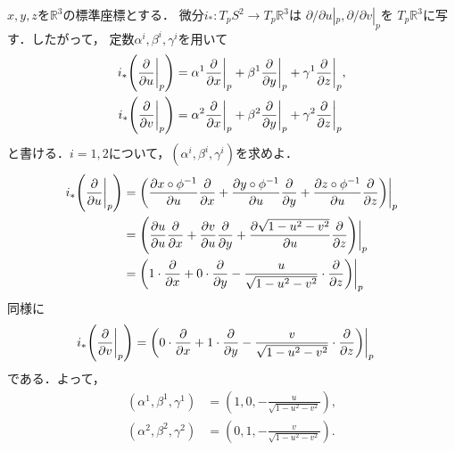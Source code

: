 \documentclass[dvipdfmx,a4paper,11pt]{jsarticle}
\begin{document}
\begin{enumerate}
  $x,y,z$を$\mathbb{R}^3$の標準座標とする．
  微分$i_*\colon T_p S^2\to T_p\mathbb{R}^3$は
  $\partial/\partial u|_p,\partial/\partial v|_p$を
  $T_p\mathbb{R}^3$に写す．したがって，
  定数$\alpha^i,\beta^i,\gamma^i$を用いて
  \begin{align}
    i_*\qty(\pdv{}{u}\bigg|_{p})
    &=\alpha^1\pdv{}{x}\bigg|_{p}
    +\beta^1\pdv{}{y}\bigg|_{p}
    +\gamma^1\pdv{}{z}\bigg|_{p},\\
    i_*\qty(\pdv{}{v}\bigg|_{p})
    &=\alpha^2\pdv{}{x}\bigg|_{p}
    +\beta^2\pdv{}{y}\bigg|_{p}
    +\gamma^2\pdv{}{z}\bigg|_{p}
  \end{align}
  と書ける．$i=1,2$について，$(\alpha^i,\beta^i,\gamma^i)$を求めよ．\\
  \begin{align}
    i_*\qty(\pdv{}{u}\bigg|_{p})
    &=\qty(\pdv{x\circ \phi^{-1}}{u}\pdv{}{x}
    +\pdv{y\circ \phi^{-1}}{u}\pdv{}{y}
    +\pdv{z\circ \phi^{-1}}{u}\pdv{}{z})\bigg|_{p}\\
    &=\qty(\pdv{u}{u}\pdv{}{x}
    +\pdv{v}{u}\pdv{}{y}
    +\pdv{\sqrt{1-u^2-v^2}}{u}\pdv{}{z})\bigg|_{p}\\
    &=\qty(1\cdot\pdv{}{x}
    +0\cdot\pdv{}{y}
    -\frac{u}{\sqrt{1-u^2-v^2}}\cdot\pdv{}{z})\bigg|_{p}
  \end{align}
  同様に
  \begin{align}
    i_*\qty(\pdv{}{v}\bigg|_{p})
    &=\qty(0\cdot\pdv{}{x}
    +1\cdot\pdv{}{y}
    -\frac{v}{\sqrt{1-u^2-v^2}}\cdot\pdv{}{z})\bigg|_{p}
  \end{align}
  である．よって，
  \begin{align}
    (\alpha^1,\beta^1,\gamma^1)&=\left(1,0,-\frac{u}{\sqrt{1-u^2-v^2}}\right),\\
    (\alpha^2,\beta^2,\gamma^2)&=\left(0,1,-\frac{v}{\sqrt{1-u^2-v^2}}\right).
  \end{align}
\end{enumerate}
\end{document}
